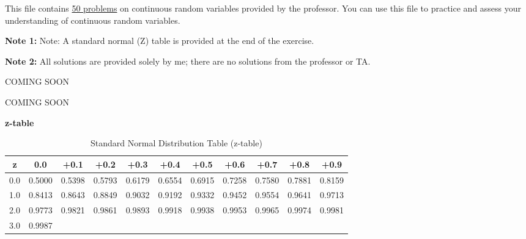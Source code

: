\documentclass[a4paper, 10pt]{article}
\newcommand{\zScoreTable}[1]{
    \par\noindent \textbf{z-table}
    \begin{table}[h]
        \centering
        \renewcommand{\arraystretch}{#1}
        \begin{tabular}{|c|cccccccccc|}
            \hline
            \textbf{z} & 0.0 & +0.1 & +0.2 & +0.3 & +0.4 & +0.5 & +0.6 & +0.7 & +0.8 & +0.9 \\
            \hline
            0.0 & 0.5000 & 0.5398 & 0.5793 & 0.6179 & 0.6554 & 0.6915 & 0.7258 & 0.7580 & 0.7881 & 0.8159 \\
            1.0 & 0.8413 & 0.8643 & 0.8849 & 0.9032 & 0.9192 & 0.9332 & 0.9452 & 0.9554 & 0.9641 & 0.9713 \\
            2.0 & 0.9773 & 0.9821 & 0.9861 & 0.9893 & 0.9918 & 0.9938 & 0.9953 & 0.9965 & 0.9974 & 0.9981 \\
            3.0 & 0.9987 & & & & & & & & & \\
            \hline
        \end{tabular}
        \caption{Standard Normal Distribution Table (z-table)}
        \label{tab:z-table}
    \end{table}
}
\begin{document}
\subject[2110205 - Statistics for Computer Engineering]

\noindent This file contains \underline{50 problems} on continuous random variables provided by the professor.
You can use this file to practice and assess your understanding of continuous random variables.

\par\noindent\textbf{Note 1:} Note: A standard normal (Z) table is provided at the end of the exercise.
\par\noindent\textbf{Note 2:} All solutions are provided solely by me; there are no solutions from the professor or TA.

\begin{problem}
COMING SOON
\end{problem}

\begin{solution}
  COMING SOON
\end{solution}

\vspace{1.5cm}

\zScoreTable{1.2}
\end{document}
